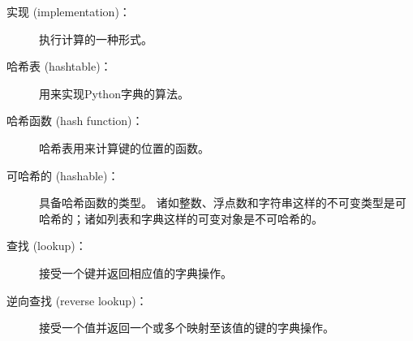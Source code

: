 \begin{description}
\item[实现 (implementation)：] 执行计算的一种形式。



\item[哈希表 (hashtable)：] 用来实现Python字典的算法。



\item[哈希函数 (hash function)：] 哈希表用来计算键的位置的函数。



\item[可哈希的 (hashable)：] 具备哈希函数的类型。  诸如整数、浮点数和字符串这样的不可变类型是可哈希的；诸如列表和字典这样的可变对象是不可哈希的。



\item[查找 (lookup)：] 接受一个键并返回相应值的字典操作。



\item[逆向查找 (reverse lookup)：] 接受一个值并返回一个或多个映射至该值的键的字典操作。




\end{description}
